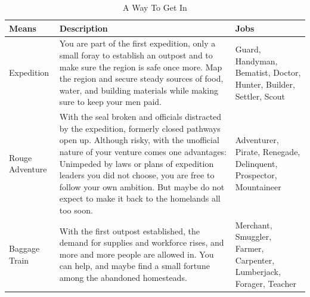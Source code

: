 \documentclass{zine}
\begin{document}


\pagebreak

\onecolumn

\begin{table}[H]
	\small
	\centering
	\caption{A Way To Get In}
	\begin{tabularx}{\textwidth}{
		>{\raggedleft}p{4.2em}
		X %
		>{\raggedright\arraybackslash}p{7.9em}}
		\toprule
		Means                   & Description                                                                                                                                                                                                                                              & Jobs                                                         \\
		\midrule
		Expedition              & You are part of the first expedition, only a small foray to establish an outpost and to make sure the region is safe once more. Map the region and secure steady sources of food, water, and building materials while making sure to keep your men paid. & Guard, Handyman, Bematist, Doctor, Hunter, Builder, Settler,
		Scout                                                                                                                                                                                                                                                                                                                                             \\
		\midrule
		Rouge Adventure         & With the seal broken and officials distracted by the
		expedition, formerly closed pathways open up. Although risky, with the
		unofficial nature of your venture comes one advantages: Unimpeded by
		laws or plans of expedition leaders you did not choose, you are free to
		follow your own ambition. But maybe do not expect to make it back to the
		homelands all too soon. & Adventurer, Pirate, Renegade, Delinquent,
		Prospector, Mountaineer                                                                                                                                                                                                                                                                                                                           \\
		\midrule
		Baggage Train           & With the first outpost established, the demand for
		supplies and workforce rises, and more and more people are allowed in.
		You can help, and maybe find a small fortune among the abandoned
		homesteads.             & Merchant, Smuggler, Farmer, Carpenter, Lumberjack,
		Forager, Teacher                                                                                                                                                                                                                                                                                                                                  \\
		\bottomrule
	\end{tabularx}
\end{table}
\end{document}
